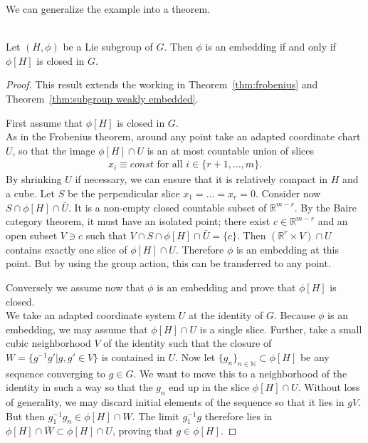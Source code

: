 We can generalize the example into a theorem.

\begin{theorem}
\textup{\cite[3.21]{Warner1983}}\\
Let $(H,\phi)$ be a Lie subgroup of $G$. Then $\phi$ is an embedding if and only if $\phi[H]$ is closed in $G$.
\end{theorem}
\begin{proof}
This result extends the working in Theorem~\ref{thm:frobenius} and Theorem~\ref{thm:subgroup weakly embedded}.

First assume that $\phi[H]$ is closed in $G$.\\
As in the Frobenius theorem, around any point take an adapted coordinate chart $U$, so that the image $\phi[H]\cap U$ is an at most countable union of slices 
\begin{align*}
x_i \equiv const \text{ for all } i \in \{r+1,\dots,m\}.
\end{align*} 
By shrinking $U$ if necessary, we can ensure that it is relatively compact in $H$ and a cube.
Let $S$ be the perpendicular slice $x_1 = \dots = x_r = 0$.
Consider now $S \cap \phi[H] \cap \bar{U}$.
It is a non-empty closed countable subset of $\mathbb{R}^{m-r}$.
By the Baire category theorem, it must have an isolated point; there exist $c \in \mathbb{R}^{m-r}$ and an open subset $V \ni c$ such that $V \cap S \cap \phi[H] \cap \bar{U} = \{c\}$.
Then $(\mathbb{R}^r \times V) \cap U$ contains exactly one slice of $\phi[H]\cap U$.
Therefore $\phi$ is an embedding at this point.
But by using the group action, this can be transferred to any point.

Conversely we assume now that $\phi$ is an embedding and prove that $\phi[H]$ is closed. \\
We take an adapted coordinate system $U$ at the identity of $G$.
Because $\phi$ is an embedding, we may assume that $\phi[H] \cap U$ is a single slice.
Further, take a small cubic neighborhood $V$ of the identity such that the closure of $W = \{g^{-1}g' | g,g' \in V \}$ is contained in $U$.
Now let $\{g_n\}_{n \in \mathbb{N}} \subset \phi[H]$ be any sequence converging to $g \in G$. 
We want to move this to a neighborhood of the identity in such a way so that the $g_n$ end up in the slice $\phi[H] \cap U$.
Without loss of generality, we may discard initial elements of the sequence so that it lies in $gV$. 
But then $g_1^{-1}g_n \in \phi[H] \cap W$.
The limit $g_1^{-1}g$ therefore lies in $\phi[H] \cap \bar{W} \subset \phi[H] \cap U$, proving that $g \in \phi[H]$.
\end{proof}

